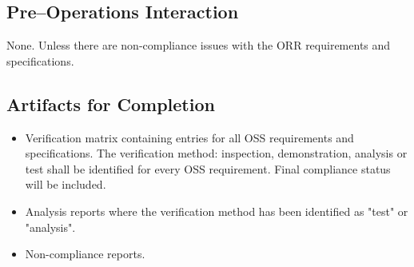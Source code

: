 \subsection{Pre--Operations Interaction}
None. Unless there are non-compliance issues with the ORR requirements and specifications.

\subsection{Artifacts for Completion}

\begin{itemize}
 
	\item Verification matrix containing entries for all OSS requirements and specifications.  The verification method: inspection, demonstration, analysis or test shall be identified for every OSS requirement.  Final compliance status will be included.
	\item Analysis reports where the verification method has been identified as "test" or "analysis".
	\item Non-compliance reports.

\end{itemize}